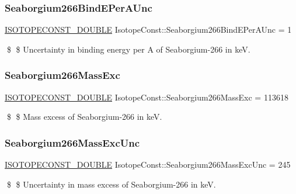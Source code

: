 \subsubsection{\texorpdfstring{Seaborgium266\+Bind\+E\+Per\+A\+Unc}{Seaborgium266BindEPerAUnc}}
{\footnotesize\ttfamily \mbox{\hyperlink{group___isotope_const-_macros_ga8f45a7272ce02c0b4c65c44636ed719a}{I\+S\+O\+T\+O\+P\+E\+C\+O\+N\+S\+T\+\_\+\+D\+O\+U\+B\+LE}} Isotope\+Const\+::\+Seaborgium266\+Bind\+E\+Per\+A\+Unc = 1}

\$ \$ Uncertainty in binding energy per A of Seaborgium-\/266 in keV. \mbox{\label{group___isotope_const-_seaborgium-_sg266_ga10264974c8c24c44b7fa73be942cb3df}} 
\subsubsection{\texorpdfstring{Seaborgium266\+Mass\+Exc}{Seaborgium266MassExc}}
{\footnotesize\ttfamily \mbox{\hyperlink{group___isotope_const-_macros_ga8f45a7272ce02c0b4c65c44636ed719a}{I\+S\+O\+T\+O\+P\+E\+C\+O\+N\+S\+T\+\_\+\+D\+O\+U\+B\+LE}} Isotope\+Const\+::\+Seaborgium266\+Mass\+Exc = 113618}

\$ \$ Mass excess of Seaborgium-\/266 in keV. \mbox{\label{group___isotope_const-_seaborgium-_sg266_gabb59cead9ee36365574c8fd487b08e58}} 
\subsubsection{\texorpdfstring{Seaborgium266\+Mass\+Exc\+Unc}{Seaborgium266MassExcUnc}}
{\footnotesize\ttfamily \mbox{\hyperlink{group___isotope_const-_macros_ga8f45a7272ce02c0b4c65c44636ed719a}{I\+S\+O\+T\+O\+P\+E\+C\+O\+N\+S\+T\+\_\+\+D\+O\+U\+B\+LE}} Isotope\+Const\+::\+Seaborgium266\+Mass\+Exc\+Unc = 245}

\$ \$ Uncertainty in mass excess of Seaborgium-\/266 in keV. \mbox{\label{group___isotope_const-_seaborgium-_sg266_ga5aaabe4689a54f9d6146a2bf29766bae}} 
